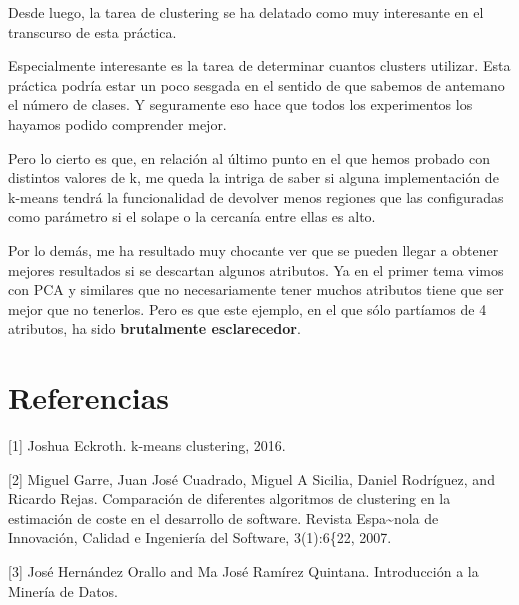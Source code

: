 \documentclass[11pt]{article}
\begin{document}
Desde luego, la tarea de clustering se ha delatado como muy interesante
en el transcurso de esta práctica.

Especialmente interesante es la tarea de determinar cuantos clusters
utilizar. Esta práctica podría estar un poco sesgada en el sentido de
que sabemos de antemano el número de clases. Y seguramente eso hace que
todos los experimentos los hayamos podido comprender mejor.

Pero lo cierto es que, en relación al último punto en el que hemos
probado con distintos valores de k, me queda la intriga de saber si
alguna implementación de k-means tendrá la funcionalidad de devolver
menos regiones que las configuradas como parámetro si el solape o la
cercanía entre ellas es alto.

Por lo demás, me ha resultado muy chocante ver que se pueden llegar a
obtener mejores resultados si se descartan algunos atributos. Ya en el
primer tema vimos con PCA y similares que no necesariamente tener muchos
atributos tiene que ser mejor que no tenerlos. Pero es que este ejemplo,
en el que sólo partíamos de 4 atributos, ha sido \textbf{brutalmente
esclarecedor}.

\section{Referencias}\label{referencias}

{[}1{]} Joshua Eckroth. k-means clustering, 2016.

{[}2{]} Miguel Garre, Juan José Cuadrado, Miguel A Sicilia, Daniel
Rodríguez, and Ricardo Rejas. Comparación de diferentes algoritmos de
clustering en la estimación de coste en el desarrollo de software.
Revista Espa\textasciitilde{}nola de Innovación, Calidad e Ingeniería
del Software, 3(1):6\{22, 2007.

{[}3{]} José Hernández Orallo and Ma José Ramírez Quintana. Introducción
a la Minería de Datos.


    
    
    
    
\end{document}
